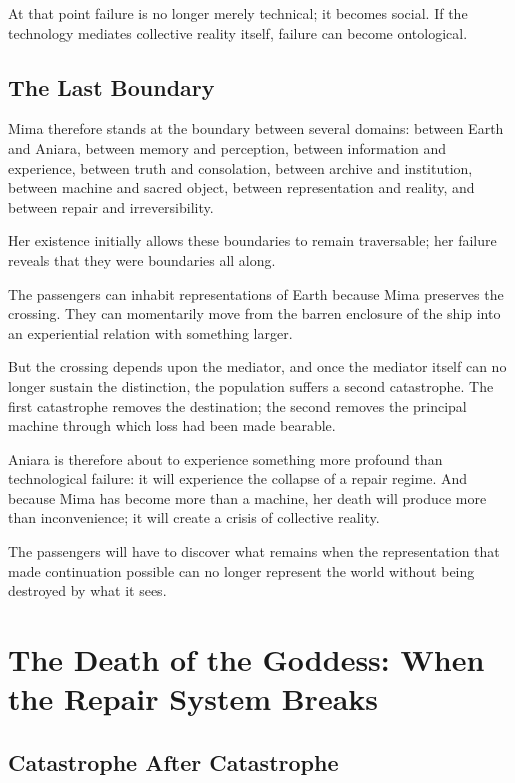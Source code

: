 \documentclass[11pt,oneside]{book}
\theoremstyle{definition}
\theoremstyle{remark}
\begin{document}
At that point failure is no longer merely technical; it becomes social. If the technology mediates collective reality itself, failure can become ontological.

\section{The Last Boundary}

Mima therefore stands at the boundary between several domains: between Earth and Aniara, between memory and perception, between information and experience, between truth and consolation, between archive and institution, between machine and sacred object, between representation and reality, and between repair and irreversibility.

Her existence initially allows these boundaries to remain traversable; her failure reveals that they were boundaries all along.

The passengers can inhabit representations of Earth because Mima preserves the crossing. They can momentarily move from the barren enclosure of the ship into an experiential relation with something larger.

But the crossing depends upon the mediator, and once the mediator itself can no longer sustain the distinction, the population suffers a second catastrophe. The first catastrophe removes the destination; the second removes the principal machine through which loss had been made bearable.

Aniara is therefore about to experience something more profound than technological failure: it will experience the collapse of a repair regime. And because Mima has become more than a machine, her death will produce more than inconvenience; it will create a crisis of collective reality.

The passengers will have to discover what remains when the representation that made continuation possible can no longer represent the world without being destroyed by what it sees.

\chapter{The Death of the Goddess: When the Repair System Breaks}

\section{Catastrophe After Catastrophe}
\end{document}
